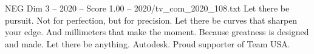 \begin{textsample}{NEG Dim 3 – 2020 – Score 1.00 – 2020/tv\_com\_2020\_108.txt}  \label{ex:f3_neg_037}
Let there be pursuit.
Not for perfection, but for precision.
Let there be curves that sharpen your edge.
And millimeters that make the moment.
Because greatness is designed and made.
Let there be anything.
Autodesk.
Proud supporter of Team USA.

\end{textsample}
